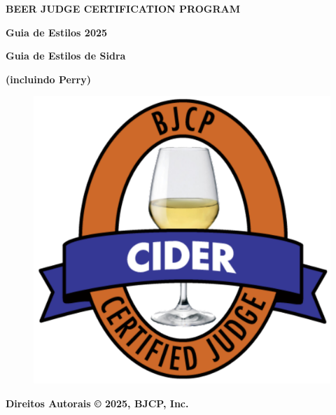 \begin{titlepage}

    \centering
        {\fontsize{20}{32}\selectfont \textbf{BEER JUDGE CERTIFICATION PROGRAM}}\\

        \vspace{0.8cm}

        {\fontsize{30}{38}\selectfont \textbf{Guia de Estilos 2025 }}\\

        \vspace{0.8cm}

        {\fontsize{26}{32}\selectfont \textbf{Guia de Estilos de Sidra}}\\

        \vspace{0.2cm}

        {\fontsize{20}{32}\selectfont \textbf{(incluindo Perry)}}\\

        \begin{figure}[htp]
            \centering
            \includegraphics[]{assets/bjcp-logo}
            \label{fig:bjcp-logo}
        \end{figure}

        {\fontsize{12}{32}\selectfont \textbf{Direitos Autorais © 2025, BJCP, Inc.}}\\


\end{titlepage}
